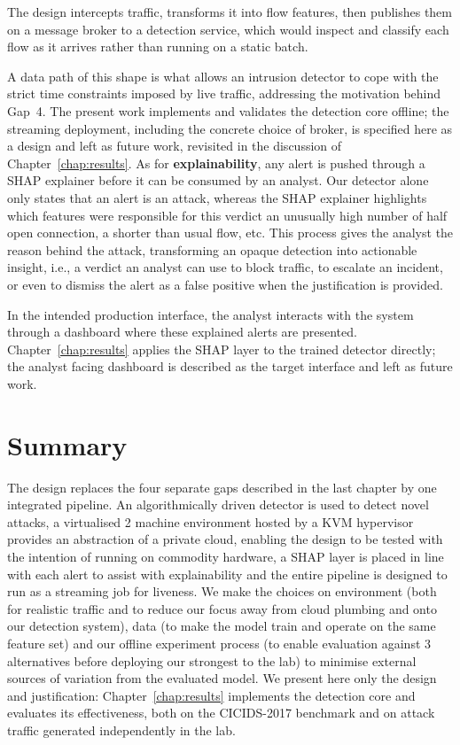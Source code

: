 The design intercepts traffic, transforms it into flow features, then publishes them on a message broker to a detection service, which would inspect and classify each flow as it arrives rather than running on a static batch.

A data path of this shape is what allows an intrusion detector to cope with the strict time constraints imposed by live traffic, addressing the motivation behind Gap~4. The present work implements and validates the detection core offline; the streaming deployment, including the concrete choice of broker, is specified here as a design and left as future work, revisited in the discussion of Chapter~\ref{chap:results}. As for \textbf{explainability}, any alert is pushed through a SHAP explainer before it can be consumed by an analyst. Our detector alone only states that an alert is an attack, whereas the SHAP explainer highlights which features were responsible for this verdict  an unusually high number of half open connection, a shorter than usual flow, etc. This process gives the analyst the reason behind the attack, transforming an opaque detection into actionable insight, i.e., a verdict an analyst can use to block traffic, to escalate an incident, or even to dismiss the alert as a false positive when the justification is provided. 

In the intended production interface, the analyst interacts with the system through a dashboard where these explained alerts are presented. Chapter~\ref{chap:results} applies the SHAP layer to the trained detector directly; the analyst facing dashboard is described as the target interface and left as future work.
\section{Summary}
\label{sec:conception_summary}

The design replaces the four separate gaps described in the last chapter by one integrated pipeline. An algorithmically driven detector is used to detect novel attacks, a virtualised 2 machine environment hosted by a KVM hypervisor provides an abstraction of a private cloud, enabling the design to be tested with the intention of running on commodity hardware, a SHAP layer is placed in line with each alert to assist with explainability and the entire pipeline is designed to run as a streaming job for liveness. We make the choices on environment (both for realistic traffic and to reduce our focus away from cloud plumbing and onto our detection system), data (to make the model train and operate on the same feature set) and our offline experiment process (to enable evaluation against 3 alternatives before deploying our strongest to the lab) to minimise external sources of variation from the evaluated model. We present here only the design and justification: Chapter~\ref{chap:results} implements the detection core and evaluates its effectiveness, both on the CICIDS-2017 benchmark and on attack traffic generated independently in the lab.
